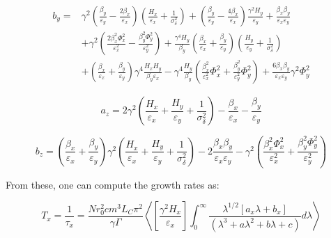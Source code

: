 \begin{equation}
    \begin{aligned}
    b_y = & \gamma^2 \left(\frac{\beta_y}{\varepsilon_y} - \frac{2 \beta_x}{\varepsilon_x}\right) \left(\frac{H_x}{\varepsilon_x} + \frac{1}{\sigma_{\delta}^{2}}\right) + \left(\frac{\beta_y}{\varepsilon_y} - \frac{4 \beta_x}{\varepsilon_x}\right) \frac{\gamma^2 H_y}{\varepsilon_y} + \frac{\beta_x \beta_y}{\varepsilon_x \varepsilon_y} \\
          & + \gamma^2 \left(\frac{2 \beta_x^{2} \Phi_x^{2}}{\varepsilon_x^{2}} - \frac{\beta_y^{2} \Phi_y^{2}}{\varepsilon_y^{2}}\right) + \frac{\gamma^4 H_y}{\beta_y} \left(\frac{\beta_x}{\varepsilon_x} + \frac{\beta_y}{\varepsilon_y}\right) \left(\frac{H_y}{\varepsilon_y} + \frac{1}{\sigma_{\delta}^{2}}\right)\\
          & + \left(\frac{\beta_x}{\varepsilon_x} + \frac{\beta_y}{\varepsilon_y}\right) \gamma^4 \frac{H_x H_y}{\beta_y \varepsilon_x} - \gamma^4 \frac{H_y}{\beta_y} \left(\frac{\beta_x^{2}}{\varepsilon_x^{2}} \Phi_x^{2} + \frac{\beta_y^{2}}{\varepsilon_y^{2}} \Phi_y^{2}\right) + \frac{6 \beta_x \beta_y}{\varepsilon_x \varepsilon_y} \gamma^2 \Phi_y^{2}
    \end{aligned}
    \label{equation:bm_by}
\end{equation}

\begin{equation}
    a_z = 2 \gamma^2 \left(\frac{H_x}{\varepsilon_x} + \frac{H_y}{\varepsilon_y} + \frac{1}{\sigma_{\delta}^{2}}\right) - \frac{\beta_x}{\varepsilon_x} - \frac{\beta_y}{\varepsilon_y}
    \label{equation:bm_az}
\end{equation}

\begin{equation}
    b_z = \left(\frac{\beta_x}{\varepsilon_x} + \frac{\beta_y}{\varepsilon_y}\right) \gamma^2 \left(\frac{H_x}{\varepsilon_x} + \frac{H_y}{\varepsilon_y} + \frac{1}{\sigma_{\delta}^{2}}\right) - 2 \frac{\beta_x \beta_y}{\varepsilon_x \varepsilon_y} - \gamma^2 \left(\frac{\beta_x^{2} \Phi_x^{2}}{\varepsilon_x^{2}} + \frac{\beta_y^{2} \Phi_y^{2}}{\varepsilon_y^{2}}\right)
    \label{equation:bm_bz}
\end{equation}

From these, one can compute the growth rates as:

\begin{equation}
    \boxed{T_x = \frac{1}{\tau_x} = \frac{N r_0^{2} c m^3 L_C \pi^2}{\gamma \Gamma} \left< \left[\frac{\gamma^2 H_x}{\varepsilon_x}\right] \int_0^{\infty} \frac{\lambda^{1/2} \left[a_x \lambda + b_x\right]}{\left(\lambda^3 + a \lambda^2 + b \lambda + c\right)} d \lambda \right>}
    \label{equation:bm_tx}
\end{equation}

